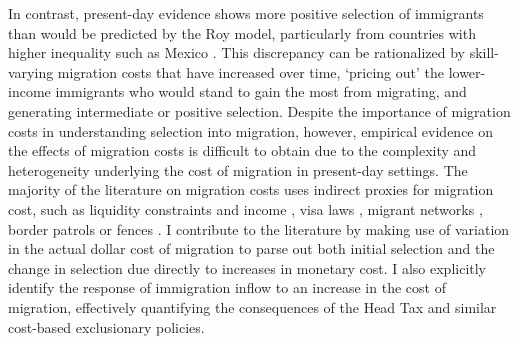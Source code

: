 In contrast, present-day evidence shows more positive selection of immigrants than would be predicted by the Roy model, particularly from countries with higher inequality such as Mexico \citep{chiquiarhanson2005, mckenzierapoport2010}. This discrepancy can be rationalized by skill-varying migration costs that have increased over time, `pricing out' the lower-income immigrants who would stand to gain the most from migrating, and generating intermediate or positive selection. 
Despite the importance of migration costs in understanding selection into migration, however, empirical evidence on the effects of migration costs is difficult to obtain due to the complexity and heterogeneity underlying the cost of migration in present-day settings. The majority of the literature on migration costs uses indirect proxies for migration cost, such as liquidity constraints and income \citep{Angelucci2015, cai2020}, visa laws \citep{ortegaperi2013}, migrant networks \citep{mckenzierapoport2010}, border patrols or fences \citep{hansonspilimbergo1999, angelucci2012,feigenberg2020}. I contribute to the literature by making use of variation in the actual dollar cost of migration to parse out both initial selection and the change in selection due directly to increases in monetary cost. I also explicitly identify the response of immigration inflow to an increase in the cost of migration, effectively quantifying the consequences of the Head Tax and similar cost-based exclusionary policies.









